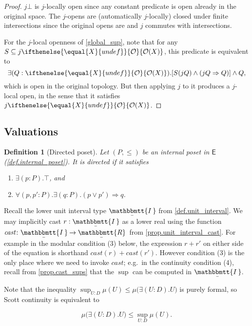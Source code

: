 \documentclass[reqno,11pt]{amsproc}
\theoremstyle{plain}
\newtheorem{definition}[theorem]{Definition}
\theoremstyle{definition}
\newcommand{\cat}[1]{\mathsf{#1}}
\renewcommand{\to}[1][]{\xrightarrow{#1}}
\newcommand{\ubar}[1]{\underaccent{\bar}{#1}}
\newcommand{\internal}[1]{\raisebox{-.03ex}{$\mathbbmtt{#1}$}}
\newcommand{\hs}{\hspace{1pt}}
\newcommand{\trr}{\internal{R}}
\newcommand{\tii}{\ubar{\internal{I\hs\hs}}\!\hs}
\newcommand{\tlrr}{\ubar{\trr}\hs}
\newcommand{\cast}{\textit{cast}}
\newcommand{\Op}[1][undef]{\ifthenelse{\equal{#1}{undef}}{\mathcal{O}}{\mathcal{O}(#1)}}
\newcommand{\imp}{\Rightarrow}
\let\originalleft\left
\let\originalright\right
\renewcommand{\left}{\mathopen{}\mathclose\bgroup\originalleft}
\renewcommand{\right}{\aftergroup\egroup\originalright}
\numberwithin{equation}{section}
\begin{document}
\begin{proof}
	$j\bot$ is $j$-locally open since any constant predicate is open already in the original space.	The $j$-opens are (automatically $j$-locally) closed under finite intersections since the original opens are and $j$ commutes with intersections. 

	For the $j$-local openness of \eqref{global_sup}, note that for any $S\subseteq j\Op[X]$, this predicate is equivalent to
	\[
		\exists (Q : \Op[X]) . \left[ S(jQ) \land (jQ \imp  Q) \right] \land Q,
	\]
	which is open in the original topology. But then applying $j$ to it produces a $j$-local open, in the sense that it satisfies $j \Op[X]$.
\end{proof}

\subsection{Valuations}\label{sec.valuations}

\begin{definition}[Directed poset]\label{def.directed}
Let $(P,\le)$ be an internal poset in $\cat{E}$ (\cref{def.internal_poset}). It is \emph{directed} if it satisfies
\begin{enumerate}
	\item $\exists(p:P).\top$, and
	\item $\forall(p,p':P).\exists(q:P).(p\lor p')\imp q$.
\end{enumerate}
\end{definition}


Recall the lower unit interval type $\tii$ from \cref{def.unit_interval}. We may implicitly cast $r:\tii$ as a lower real using the function $\cast\colon\tii\to\tlrr$ from \cref{prop.unit_interval_cast}. For example in the modular condition (3) below, the expression $r+r'$ on either side of the equation is shorthand $\cast(r)+\cast(r')$. However condition (3) is the only place where we need to invoke $\cast$; e.g.\ in the continuity condition (4), recall from \cref{prop.cast_sups} that the $\sup$ can be computed in $\tii$.

Note that the inequality $\sup_{U: D}\mu(U)\le\mu\big(\exists(U:D).U\big)$ is purely formal, so Scott continuity is equivalent to

\begin{equation}\label{eqn.scott_continuity}
	\mu\big(\exists(U:D).U\big)\le\sup_{U: D}\mu(U).
\end{equation}
\end{document}
